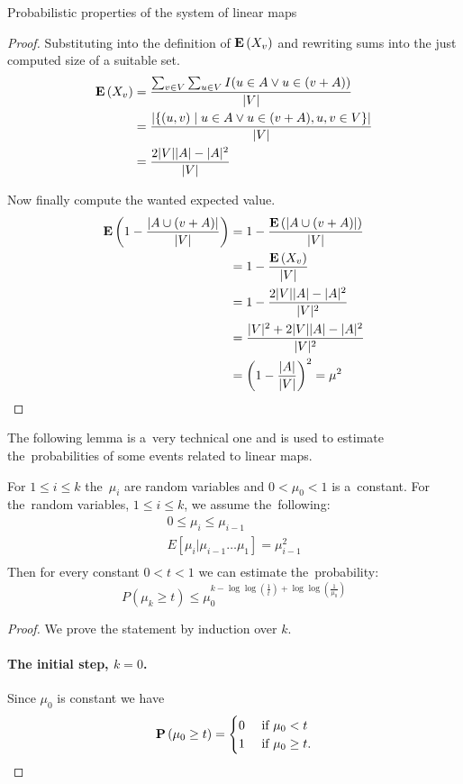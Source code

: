 \begin{section}{Probabilistic properties of the system of linear maps}
\begin{lemma}
\begin{proof}
Substituting into the definition of $\mathbf{E}\left(X_v\right)$ and rewriting sums into the just computed size of a suitable set.
\[
\begin{split}
\mathbf{E}\left(X_v\right) 
	& = \frac{\sum_{v \in V} \sum_{u \in V} I(u \in A \vee u \in (v + A))}{|V|}  \\
	& = \frac{|\{(u, v) \mid u \in A \vee u \in (v + A), u, v \in V \}|}{|V|} \\ 
	& = \frac{2|V||A| - |A|^2}{|V|} \\
\end{split}
\]

Now finally compute the wanted expected value.
\[
\begin{split}
\mathbf{E}\left(1 - \frac{|A \cup (v + A)|}{|V|}\right) 
	& = 1 - \frac{\mathbf{E}\left(|A \cup (v + A)|\right)}{|V|}  \\
	& = 1 - \frac{\mathbf{E}\left(X_v\right)}{|V|} \\
	& = 1 - \frac{2|V||A| - |A|^2}{|V|^2} \\
	& = \frac{|V|^2 + 2|V||A| - |A|^2}{|V|^2} \\
	& = \left(1 - \frac{|A|}{|V|}\right)^2 = \mu^2 \\
\end{split}
\]
\end{proof}
\end{lemma}

The following lemma is a~very technical one and is used to estimate the~probabilities of some events related to linear maps.
\begin{lemma}
\label{lemma-random-variable}
For $1 \leq i \leq k$ the~$\mu_i$ are random variables and $0 < \mu_0 < 1$ is a~constant. For the~random variables, $1 \leq i \leq k$, we assume the~following:
\begin{gather*}
0 \leq \mu_i \leq \mu_{i - 1} \\
E[ \mu_i | \mu_{i-1} \dots \mu_1 ] = \mu_{i-1}^{2} \\
\end{gather*}
Then for every constant $0 < t < 1$ we can estimate the~probability:
\begin{displaymath}
P(\mu_k \geq t) \leq \mu_0^{k - \log \log (\frac{1}{t}) + \log \log \left(\frac{1}{\mu_0}\right)}
\end{displaymath}
\end{lemma}
\begin{proof}
We prove the statement by induction over $k$. 

\paragraph*{The initial step, $k = 0$.}
Since $\mu_0$ is constant we have
\[
	\mathbf{P}\left(\mu_0 \geq t\right) = \begin{cases}
		0 & \text{ if } \mu_0 < t \\
		1 & \text{ if } \mu_0 \geq t \text{.} \\
	\end{cases}
\]


\end{proof}
\end{section}
